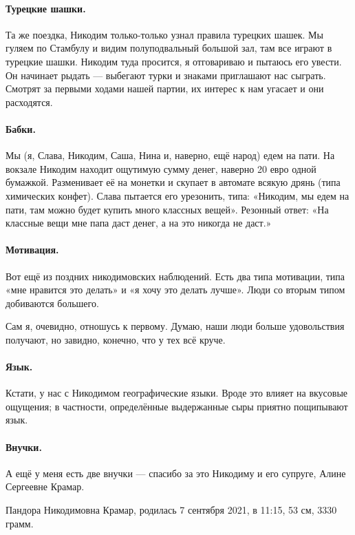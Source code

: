 \documentclass{book}
\begin{document}
\paragraph{Турецкие шашки.}
Та же поездка, Никодим только-только узнал правила турецких шашек.
Мы гуляем по Стамбулу и видим полуподвальный большой зал, там все играют в турецкие шашки.
Никодим туда просится, я отговариваю и пытаюсь его увести.
Он начинает рыдать --- выбегают турки и знаками приглашают нас сыграть.
Смотрят за первыми ходами нашей партии, их интерес к нам угасает и они расходятся.

\paragraph{Бабки.}
Мы (я, Слава, Никодим, Саша, Нина и, наверно, ещё народ) едем на пати.
На вокзале Никодим находит ощутимую сумму денег, наверно 20 евро одной бумажкой.
Разменивает её на монетки и скупает в автомате всякую дрянь (типа химических конфет).
Слава пытается его урезонить, типа: «Никодим, мы едем на пати, там можно будет купить много классных вещей».
Резонный ответ: «На классные вещи мне папа даст денег, а на это никогда не даст.» 

\paragraph{Мотивация.}
Вот ещё из поздних никодимовских наблюдений.
Есть два типа мотивации, типа «мне нравится это делать» и «я хочу это делать лучше».
Люди со вторым типом добиваются большего.

Сам я, очевидно, отношусь к первому.
Думаю, наши люди больше удовольствия получают,
но завидно, конечно, что у тех всё круче.

\paragraph{Язык.}
Кстати, у нас с Никодимом географические языки.
Вроде это влияет на вкусовые ощущения;
в частности, определённые выдержанные сыры приятно пощипывают язык.


\paragraph{Внучки.}
А ещё у меня есть две внучки --- спасибо за это Никодиму и его супруге, Алине Сергеевне Крамар.

Пандора Никодимовна Крамар, родилась 7 сентября 2021, в 11:15, 53 см, 3330 грамм.
\end{document}
